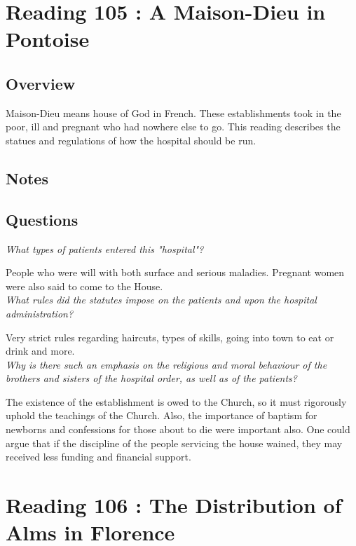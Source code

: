 \documentclass[12pt]{article}
\begin{document}
{\section*{Reading 105 : A Maison-Dieu in Pontoise}

\subsection*{Overview}

Maison-Dieu means house of God in French. These establishments took in the poor, ill and pregnant who had nowhere else to go. This reading describes the statues and regulations of how the hospital should be run.

\subsection*{Notes}

\subsection*{Questions}

\textit{What types of patients entered this "hospital"?}

People who were will with both surface and serious maladies. Pregnant women were also said to come to the House.\\

\textit{What rules did the statutes impose on the patients and upon the hospital administration?}

Very strict rules regarding haircuts, types of skills, going into town to eat or drink and more.\\

\textit{Why is there such an emphasis on the religious and moral behaviour of the brothers and sisters of the hospital order, as well as of the patients?}

The existence of the establishment is owed to the Church, so it must rigorously uphold the teachings of the Church. Also, the importance of baptism for newborns and confessions for those about to die were important also. One could argue that if the discipline of the people servicing the house wained, they may received less funding and financial support. \\

\section*{Reading 106 : The Distribution of Alms in Florence}

}
\end{document}
